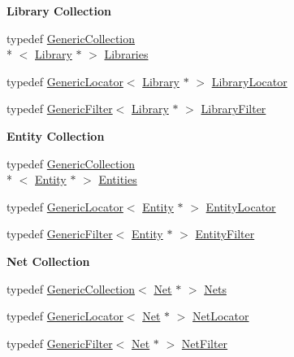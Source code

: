 \begin{Indent}{\bf Library Collection}\par
\begin{DoxyCompactItemize}
\item 
typedef \hyperlink{classHurricane_1_1GenericCollection}{Generic\-Collection}\\*
$<$ \hyperlink{classHurricane_1_1Library}{Library} $\ast$ $>$ \hyperlink{namespaceHurricane_a2868a53bbb0507710460ff02fab77cad}{Libraries}
\item 
typedef \hyperlink{classHurricane_1_1GenericLocator}{Generic\-Locator}$<$ \hyperlink{classHurricane_1_1Library}{Library} $\ast$ $>$ \hyperlink{namespaceHurricane_a0477ab8ee799bb25ce9521ac16dbb6b9}{Library\-Locator}
\item 
typedef \hyperlink{classHurricane_1_1GenericFilter}{Generic\-Filter}$<$ \hyperlink{classHurricane_1_1Library}{Library} $\ast$ $>$ \hyperlink{namespaceHurricane_a72d63f6bfd54feac2663e60430fd443d}{Library\-Filter}
\end{DoxyCompactItemize}
\end{Indent}
\begin{Indent}{\bf Entity Collection}\par
\begin{DoxyCompactItemize}
\item 
typedef \hyperlink{classHurricane_1_1GenericCollection}{Generic\-Collection}\\*
$<$ \hyperlink{classHurricane_1_1Entity}{Entity} $\ast$ $>$ \hyperlink{namespaceHurricane_af50ef2888fd2a5b58b0de14cdfaabc56}{Entities}
\item 
typedef \hyperlink{classHurricane_1_1GenericLocator}{Generic\-Locator}$<$ \hyperlink{classHurricane_1_1Entity}{Entity} $\ast$ $>$ \hyperlink{namespaceHurricane_ad3f039057bc40adfd993d83ace24fb83}{Entity\-Locator}
\item 
typedef \hyperlink{classHurricane_1_1GenericFilter}{Generic\-Filter}$<$ \hyperlink{classHurricane_1_1Entity}{Entity} $\ast$ $>$ \hyperlink{namespaceHurricane_af0fe741a1ef28dedcb26bf979b1dea5c}{Entity\-Filter}
\end{DoxyCompactItemize}
\end{Indent}
\begin{Indent}{\bf Net Collection}\par
\begin{DoxyCompactItemize}
\item 
typedef \hyperlink{classHurricane_1_1GenericCollection}{Generic\-Collection}$<$ \hyperlink{classHurricane_1_1Net}{Net} $\ast$ $>$ \hyperlink{namespaceHurricane_a3404a8b17130a1824f4a281704b04df7}{Nets}
\item 
typedef \hyperlink{classHurricane_1_1GenericLocator}{Generic\-Locator}$<$ \hyperlink{classHurricane_1_1Net}{Net} $\ast$ $>$ \hyperlink{namespaceHurricane_a2911512d442f8332c3cd3a135332cc02}{Net\-Locator}
\item 
typedef \hyperlink{classHurricane_1_1GenericFilter}{Generic\-Filter}$<$ \hyperlink{classHurricane_1_1Net}{Net} $\ast$ $>$ \hyperlink{namespaceHurricane_a0dfd2c5b40325a919d139091312732e9}{Net\-Filter}
\end{DoxyCompactItemize}
\end{Indent}
